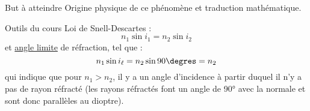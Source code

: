 \documentclass[../main/main.tex]{subfiles}
\begin{document}
\begin{tcbraster}[raster columns=2, raster equal height=rows]
    \begin{NCprop}{But à atteindre}
        Origine physique de ce phénomène et traduction mathématique.
    \end{NCprop}    
    \begin{NCdemo}{Outils du cours}
        Loi de Snell-Descartes :
        \[ n_1\sin i_1 = n_2\sin i_2\]
        et \underline{angle limite} de réfraction, tel que :
        \[ n_1\sin i_\ell = n_2\sin 90\degres = n_2\]
        qui indique que pour $n_1 > n_2$, il y a un angle d'incidence à
        partir duquel il n'y a pas de rayon réfracté (les rayons réfractés font un
        angle de 90° avec la normale et sont donc parallèles au dioptre).
    \end{NCdemo}
\end{tcbraster}
\end{document}
